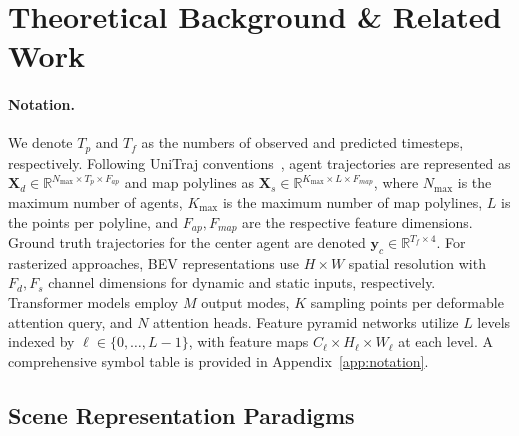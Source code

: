 \section{Theoretical Background \& Related Work}
\label{sec:background}

\paragraph{Notation.} We denote \(T_p\) and \(T_f\) as the numbers of observed and predicted timesteps, respectively. Following UniTraj conventions~\cite{unitrajFeng2024}, agent trajectories are represented as \(\boldsymbol{X}_d \in \mathbb{R}^{N_{\max} \times T_p \times F_{ap}}\) and map polylines as \(\boldsymbol{X}_s \in \mathbb{R}^{K_{\max} \times L \times F_{map}}\), where \(N_{\max}\) is the maximum number of agents, \(K_{\max}\) is the maximum number of map polylines, \(L\) is the points per polyline, and \(F_{ap}, F_{map}\) are the respective feature dimensions. Ground truth trajectories for the center agent are denoted \(\boldsymbol{y}_c \in \mathbb{R}^{T_f \times 4}\). For rasterized approaches, BEV representations use \(H \times W\) spatial resolution with \(F_d, F_s\) channel dimensions for dynamic and static inputs, respectively. Transformer models employ \(M\) output modes, \(K\) sampling points per deformable attention query, and \(N\) attention heads. Feature pyramid networks utilize \(L\) levels indexed by \(\ell \in \{0,\dots,L-1\}\), with feature maps \(C_\ell \times H_\ell \times W_\ell\) at each level. A comprehensive symbol table is provided in Appendix~\ref{app:notation}.


\subsection{Scene Representation Paradigms}
\label{ssec:scene_repr}

